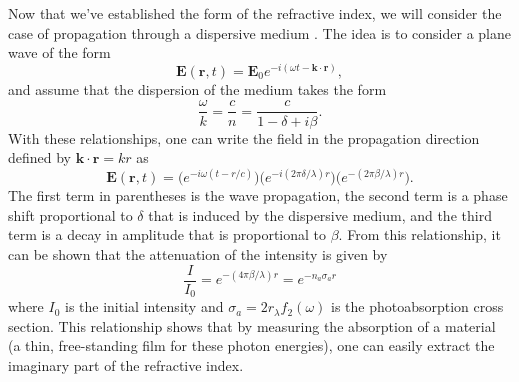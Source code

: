 Now that we've established the form of the refractive index, we will consider the case of propagation through a dispersive medium \cite{attwoodSoftXraysExtreme2000}. The idea is to consider a plane wave of the form
\begin{equation}
	\mathbf{E}(\mathbf{r},t)=\mathbf{E}_0e^{-i(\omega t - \mathbf{k}\cdot\mathbf{r})},
\end{equation}
and assume that the dispersion of the medium takes the form
\begin{equation}
	\frac{\omega}{k}=\frac{c}{n}=\frac{c}{1-\delta+i\beta}.
\end{equation}
With these relationships, one can write the field in the propagation direction defined by $\mathbf{k}\cdot\mathbf{r}=kr$ as
\begin{equation}
\label{eqn:wave_prop}
	\mathbf{E}(\mathbf{r},t)=\big(e^{-i\omega(t - r/c)}\big) \big(e^{-i(2\pi\delta/\lambda)r}\big) \big(e^{-(2\pi\beta/\lambda)r}\big).
\end{equation}
The first term in parentheses is the wave propagation, the second term is a phase shift proportional to $\delta$ that is induced by the dispersive medium, and the third term is a decay in amplitude that is proportional to $\beta$.  From this relationship, it can be shown that the attenuation of the intensity is given by 
\begin{equation}
\label{eqn:beer-lambert}
	\frac{I}{I_0}=e^{-(4\pi\beta/\lambda)r}=e^{-n_a \sigma_a r}
\end{equation}
where $I_0$ is the initial intensity and $\sigma_a=2r_\lambda f_2(\omega)$ is the photoabsorption cross section.  This relationship shows that by measuring the absorption of a material (a thin, free-standing film for these photon energies), one can easily extract the imaginary part of the refractive index.

